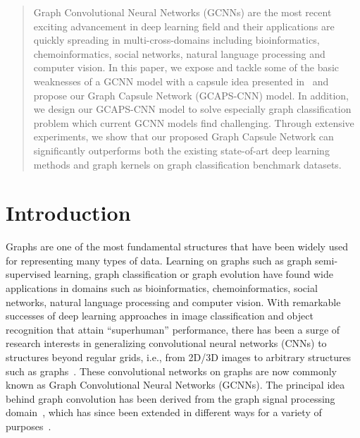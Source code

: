 \documentclass{article}
\begin{document}
\begin{abstract}

Graph Convolutional Neural Networks (GCNNs) are the most recent exciting advancement in   deep learning field  and their applications are quickly spreading in  multi-cross-domains including  bioinformatics,  chemoinformatics,  social networks,  natural language processing and computer vision. In this paper, we expose and  tackle some of the basic weaknesses of a   GCNN model with a capsule idea presented in~\cite{hinton2011transforming} and propose our Graph Capsule Network (GCAPS-CNN) model. In addition, we design our GCAPS-CNN model to solve especially  graph classification problem which current GCNN models find challenging. Through extensive experiments, we show that our proposed Graph Capsule Network can significantly   outperforms both the existing state-of-art deep   learning methods and graph kernels   on   graph classification benchmark datasets.
\end{abstract}


\section{Introduction}
Graphs are one of the most fundamental structures that have been widely used for representing many types of data. Learning on graphs such as graph semi-supervised learning, graph classification or  graph evolution have found wide applications  in domains such as  bioinformatics,  chemoinformatics,  social networks, natural language processing and computer vision. With remarkable successes of deep learning approaches in image  classification and object recognition that attain ``superhuman'' performance, there has been a surge of research interests in generalizing convolutional neural networks (CNNs) to structures beyond regular grids, i.e., from 2D/3D images to arbitrary structures such as graphs~\cite{bruna2013spectral,henaff2015deep,defferrard2016convolutional,kipf2016semi}. These convolutional networks on graphs are now commonly known as Graph Convolutional Neural Networks (GCNNs). The principal idea behind graph convolution  has been derived from the  graph signal processing domain~\cite{shuman2013emerging}, which has since been extended in different ways for a variety of purposes~\cite{duvenaud2015convolutional, gilmer2017neural, kondor2018covariant}. 
\end{document}

